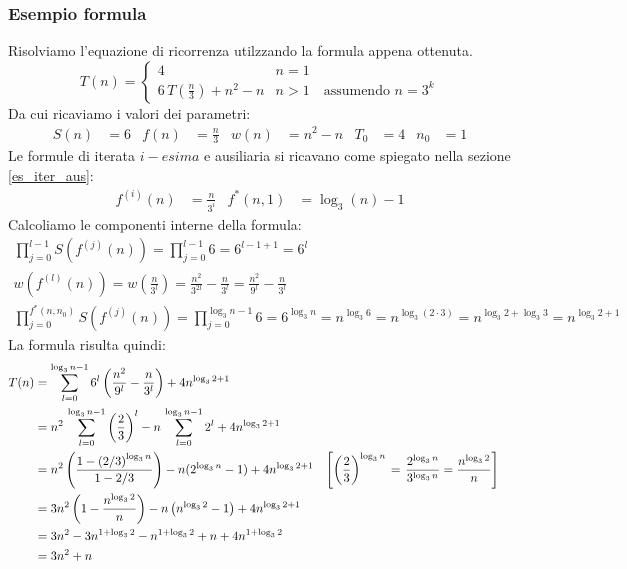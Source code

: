 \subsubsection{Esempio formula}
Risolviamo l'equazione di ricorrenza utilzzando la formula appena ottenuta.
\[
    T(n) = 
    \begin{cases} 
        4      &  n = 1 \\
        6 \, T\left(\frac{n}{3}\right) + n^2-n & n > 1 \quad \text{assumendo } n=3^k
    \end{cases}
\]
Da cui ricaviamo i valori dei parametri:
\begin{align*}
    S(n)&=6 & f(n)&=\frac{n}{3} & w(n)&=n^2-n & T_0&=4 & n_0&=1
\end{align*}
Le formule di iterata $i-esima$ e ausiliaria si ricavano come spiegato nella sezione \ref{es_iter_aus}:
\begin{align*}
    f^{(i)}(n) &= \frac{n}{3^i} & f^*(n, 1) &= \log_3 \left( n \right) - 1
\end{align*}
Calcoliamo le componenti interne della formula:
\begin{gather*}
    \prod_{j=0}^{l-1} S \left( f^{(j)}(n) \right) = \prod_{j=0}^{l-1} 6 = 6^{l-1+1} = 6^l \\
    w\left(f^{(l)}(n) \right) =  w \left( \frac{n}{3^l} \right) = \frac{n^2}{3^{2l}} - \frac{n}{3^l} = \frac{n^2}{9^l}-\frac{n}{3^l} \\
    \prod_{j=0}^{f^*(n,n_0)} S \left( f^{(j)}(n) \right) = \prod_{j=0}^{\log_3 n-1} 6 = 6^{\log_3 n} =
    n^{\log_3 6} = n^{\log_3 (2\cdot3)} = n^{\log_3 2 + \log_3 3} = n^{\log_3 2 + 1}
\end{gather*}
La formula risulta quindi:
\begin{align*}
    T(n) & = \sum_{l=0}^{\log_3 n-1} 6^l \left( \frac{n^2}{9^l}-\frac{n}{3^l} \right) + 4 n^{\log_3 2 + 1} \\
    & = n^2\,\sum_{l=0}^{\log_3 n-1} \left( \frac{2}{3} \right)^l - n\,\sum_{l=0}^{\log_3 n-1} 2^l+ 4 n^{\log_3 2+1} \\
    & = n^2 \left( \frac{1- \left( 2/3 \right)^{\log_3 n} }{1 - 2/3 } \right) - n(2^{\log_3 n} -1) + 4 n^{\log_3 2+1} 
    &
    \left[
    \left( \frac{2}{3} \right)^{\log_3 n}
    \right. %
    &=      %
    \left.  %
    \frac{2^{\log_3 n}}{3^{\log_3 n}} = \frac{n^{\log_3 2}}{n}
    \vphantom{\left( \frac{2}{3} \right)^{\log_3 n}}
    \right] %
    \\
    & = 3n^2 \left( 1- \frac{n^{\log_3 2}}{n} \right) - n \left( n^{\log_3 2}-1 \right) + 4 n^{\log_3 2+1} \\
    & = 3n^2 -3n^{1+\log_3 2} - n^{1+\log_3 2} + n + 4 n^{1+\log_3 2} \\
    & = 3n^2+n
\end{align*}
